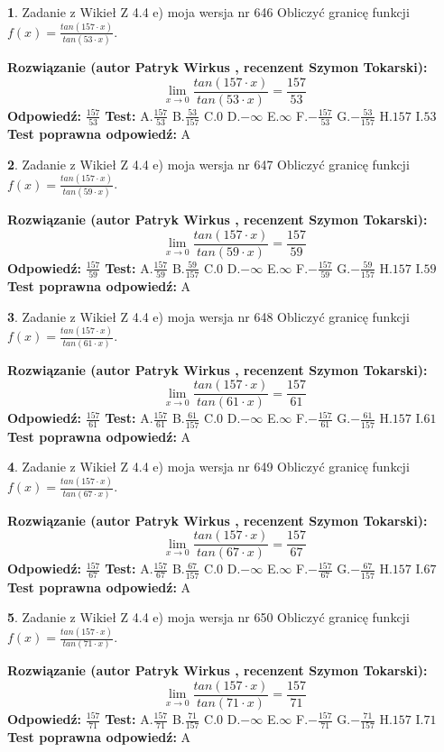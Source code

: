 \documentclass[12pt, a4paper]{article}
\theoremstyle{definition} %
\newtheorem{zad}{}
\newcommand{\zadStart}[1]{\begin{zad}#1\newline}
\newcommand{\zadStop}{\end{zad}}
\newcommand{\rozwStart}[2]{\noindent \textbf{Rozwiązanie (autor #1 , recenzent #2): }\newline}
\newcommand{\rozwStop}{\newline}
\newcommand{\odpStart}{\noindent \textbf{Odpowiedź:}\newline}
\newcommand{\odpStop}{\newline}
\newcommand{\testStart}{\noindent \textbf{Test:}\newline}
\newcommand{\testStop}{\newline}
\newcommand{\kluczStart}{\noindent \textbf{Test poprawna odpowiedź:}\newline}
\newcommand{\kluczStop}{\newline}
\begin{document}
\zadStart{Zadanie z Wikieł Z 4.4 e) moja wersja nr 646}
Obliczyć granicę funkcji $f(x)=\frac{tan(157\cdot x)}{tan(53\cdot x)}$.
\zadStop
\rozwStart{Patryk Wirkus}{Szymon Tokarski}
$$\lim\limits_{x\to 0}\frac{tan(157\cdot x)}{tan(53\cdot x)}=
\frac{157}{53}$$
\rozwStop
\odpStart
$\frac{157}{53}$
\odpStop
\testStart
A.$\frac{157}{53}$
B.$\frac{53}{157}$
C.$0$
D.$-\infty$
E.$\infty$
F.$-\frac{157}{53}$
G.$-\frac{53}{157}$
H.$157$
I.$53$
\testStop
\kluczStart
A
\kluczStop



\zadStart{Zadanie z Wikieł Z 4.4 e) moja wersja nr 647}
Obliczyć granicę funkcji $f(x)=\frac{tan(157\cdot x)}{tan(59\cdot x)}$.
\zadStop
\rozwStart{Patryk Wirkus}{Szymon Tokarski}
$$\lim\limits_{x\to 0}\frac{tan(157\cdot x)}{tan(59\cdot x)}=
\frac{157}{59}$$
\rozwStop
\odpStart
$\frac{157}{59}$
\odpStop
\testStart
A.$\frac{157}{59}$
B.$\frac{59}{157}$
C.$0$
D.$-\infty$
E.$\infty$
F.$-\frac{157}{59}$
G.$-\frac{59}{157}$
H.$157$
I.$59$
\testStop
\kluczStart
A
\kluczStop



\zadStart{Zadanie z Wikieł Z 4.4 e) moja wersja nr 648}
Obliczyć granicę funkcji $f(x)=\frac{tan(157\cdot x)}{tan(61\cdot x)}$.
\zadStop
\rozwStart{Patryk Wirkus}{Szymon Tokarski}
$$\lim\limits_{x\to 0}\frac{tan(157\cdot x)}{tan(61\cdot x)}=
\frac{157}{61}$$
\rozwStop
\odpStart
$\frac{157}{61}$
\odpStop
\testStart
A.$\frac{157}{61}$
B.$\frac{61}{157}$
C.$0$
D.$-\infty$
E.$\infty$
F.$-\frac{157}{61}$
G.$-\frac{61}{157}$
H.$157$
I.$61$
\testStop
\kluczStart
A
\kluczStop



\zadStart{Zadanie z Wikieł Z 4.4 e) moja wersja nr 649}
Obliczyć granicę funkcji $f(x)=\frac{tan(157\cdot x)}{tan(67\cdot x)}$.
\zadStop
\rozwStart{Patryk Wirkus}{Szymon Tokarski}
$$\lim\limits_{x\to 0}\frac{tan(157\cdot x)}{tan(67\cdot x)}=
\frac{157}{67}$$
\rozwStop
\odpStart
$\frac{157}{67}$
\odpStop
\testStart
A.$\frac{157}{67}$
B.$\frac{67}{157}$
C.$0$
D.$-\infty$
E.$\infty$
F.$-\frac{157}{67}$
G.$-\frac{67}{157}$
H.$157$
I.$67$
\testStop
\kluczStart
A
\kluczStop



\zadStart{Zadanie z Wikieł Z 4.4 e) moja wersja nr 650}
Obliczyć granicę funkcji $f(x)=\frac{tan(157\cdot x)}{tan(71\cdot x)}$.
\zadStop
\rozwStart{Patryk Wirkus}{Szymon Tokarski}
$$\lim\limits_{x\to 0}\frac{tan(157\cdot x)}{tan(71\cdot x)}=
\frac{157}{71}$$
\rozwStop
\odpStart
$\frac{157}{71}$
\odpStop
\testStart
A.$\frac{157}{71}$
B.$\frac{71}{157}$
C.$0$
D.$-\infty$
E.$\infty$
F.$-\frac{157}{71}$
G.$-\frac{71}{157}$
H.$157$
I.$71$
\testStop
\kluczStart
A
\kluczStop
\end{document}
